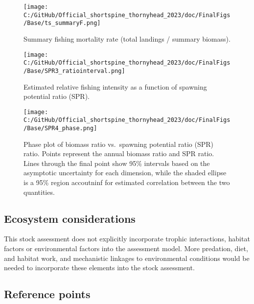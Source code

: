 \documentclass[11pt,
  english,
  letterpaper,
]{article}
\begin{document}
\begin{figure}
\centering
\texttt{[image: C:/GitHub/Official\_shortspine\_thornyhead\_2023/doc/FinalFigs/Base/ts\_summaryF.png]}
\caption{Summary fishing mortality rate (total landings / summary biomass).\label{fig:summary_fES}}
\end{figure}

\begin{figure}
\centering
\texttt{[image: C:/GitHub/Official\_shortspine\_thornyhead\_2023/doc/FinalFigs/Base/SPR3\_ratiointerval.png]}
\caption{Estimated relative fishing intensity as a function of spawning potential ratio (SPR).\label{fig:spr_trajectoryES}}
\end{figure}

\begin{figure}
\centering
\texttt{[image: C:/GitHub/Official\_shortspine\_thornyhead\_2023/doc/FinalFigs/Base/SPR4\_phase.png]}
\caption{Phase plot of biomass ratio vs.~spawning potential ratio (SPR) ratio. Points represent the annual biomass ratio and SPR ratio. Lines through the final point show 95\% intervals based on the asymptotic uncertainty for each dimension, while the shaded ellipse is a 95\% region accoutninf for estimated correlation between the two quantities.\label{fig:phase_diagramES}}
\end{figure}

\hypertarget{ecosystem-considerations}{%
\subsection*{Ecosystem considerations}\label{ecosystem-considerations}}

This stock assessment does not explicitly incorporate trophic interactions, habitat factors or environmental factors into the assessment model. More predation, diet, and habitat work, and mechanistic linkages to environmental conditions would be needed to incorporate these elements into the stock assessment.

\hypertarget{reference-points}{%
\subsection*{Reference points}\label{reference-points}}
\end{document}
